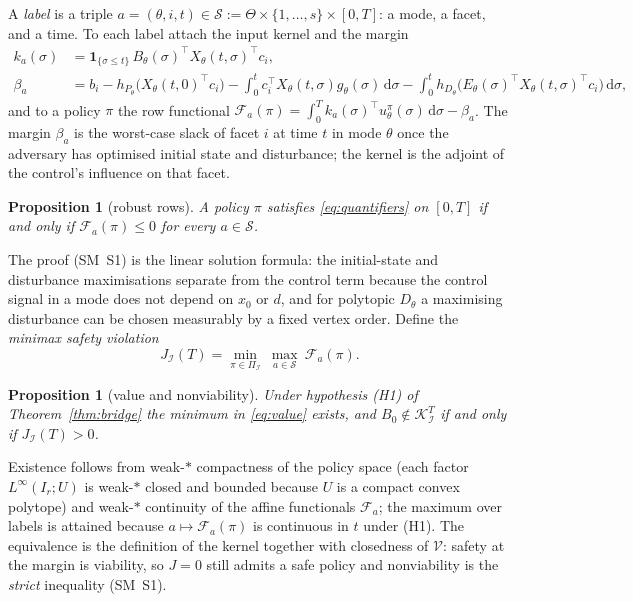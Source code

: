 \documentclass[11pt,a4paper]{article}
\theoremstyle{plain}
\newtheorem{proposition}[theorem]{Proposition}
\theoremstyle{definition}
\theoremstyle{remark}
\newcommand{\calI}{\mathcal{I}}
\newcommand{\calV}{\mathcal{V}}
\newcommand{\calK}{\mathcal{K}}
\newcommand{\calF}{\mathcal{F}}
\newcommand{\calS}{\mathscr{S}}
\newcommand{\Pol}{\Pi_{\calI}}
\newcommand{\J}{J_{\calI}(T)}
\newcommand{\dd}{\,\mathrm{d}}
\begin{document}
A \emph{label} is a triple $a=(\theta,i,t)\in\calS:=\Theta\times\{1,\dots,s\}\times[0,T]$: a mode, a facet, and a time. To each label attach the input kernel and the margin
\begin{align}
k_a(\sigma)&=\mathbf 1_{\{\sigma\le t\}}\,B_\theta(\sigma)^\top X_\theta(t,\sigma)^\top c_i,\label{eq:kernel}\\
\beta_a&=b_i-h_{P_\theta}\!\bigl(X_\theta(t,0)^\top c_i\bigr)-\int_0^t c_i^\top X_\theta(t,\sigma)g_\theta(\sigma)\dd\sigma-\int_0^t h_{D_\theta}\!\bigl(E_\theta(\sigma)^\top X_\theta(t,\sigma)^\top c_i\bigr)\dd\sigma,\label{eq:beta}
\end{align}
and to a policy $\pi$ the row functional $\calF_a(\pi)=\int_0^T k_a(\sigma)^\top u^\pi_\theta(\sigma)\dd\sigma-\beta_a$. The margin $\beta_a$ is the worst-case slack of facet $i$ at time $t$ in mode $\theta$ once the adversary has optimised initial state and disturbance; the kernel is the adjoint of the control's influence on that facet.

\begin{proposition}[robust rows]\label{prop:rows}
A policy $\pi$ satisfies \eqref{eq:quantifiers} on $[0,T]$ if and only if $\calF_a(\pi)\le0$ for every $a\in\calS$.
\end{proposition}

The proof (SM~S1) is the linear solution formula: the initial-state and disturbance maximisations separate from the control term because the control signal in a mode does not depend on $x_0$ or $d$, and for polytopic $D_\theta$ a maximising disturbance can be chosen measurably by a fixed vertex order. Define the \emph{minimax safety violation}
\begin{equation}\label{eq:value}
\J=\min_{\pi\in\Pol}\ \max_{a\in\calS}\ \calF_a(\pi).
\end{equation}

\begin{proposition}[value and nonviability]\label{prop:value}
Under hypothesis \textup{(H1)} of Theorem~\ref{thm:bridge} the minimum in \eqref{eq:value} exists, and $B_0\notin\calK^T_\calI$ if and only if $\J>0$.
\end{proposition}

Existence follows from weak-$\ast$ compactness of the policy space (each factor $L^\infty(I_r;U)$ is weak-$\ast$ closed and bounded because $U$ is a compact convex polytope) and weak-$\ast$ continuity of the affine functionals $\calF_a$; the maximum over labels is attained because $a\mapsto\calF_a(\pi)$ is continuous in $t$ under (H1). The equivalence is the definition of the kernel together with closedness of $\calV$: safety at the margin is viability, so $J=0$ still admits a safe policy and nonviability is the \emph{strict} inequality (SM~S1).
\end{document}

